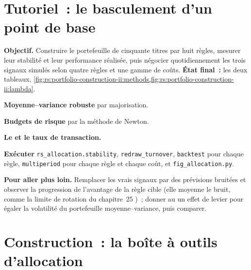 \section{Tutoriel~: le basculement d'un point de base}\label{tut:rs:portfolio-construction-ii:tut}

\begin{tutorial}
\textbf{Objectif.} Construire le portefeuille de cinquante titres par huit règles, mesurer leur stabilité et leur performance réalisée, puis négocier quotidiennement les trois signaux simulés selon
quatre règles et une gamme de coûts. \textbf{État final~:} les deux tableaux, \cref{fig:rs:portfolio-construction-ii:methods,fig:rs:portfolio-construction-ii:lambda}.
\begin{tutsteps}
\item \textbf{Moyenne--variance robuste} par majorisation.
\label{lst:rs:portfolio-construction-ii:robust}
\item \textbf{Budgets de risque} par la méthode de Newton.
\label{lst:rs:portfolio-construction-ii:budget}
\item \textbf{Le  et le taux de transaction.}
\label{lst:rs:portfolio-construction-ii:gp}
\item \textbf{Exécuter} \texttt{rs\_allocation.stability}, \texttt{redraw\_turnover}, \texttt{backtest} pour chaque règle, \texttt{multiperiod} pour chaque règle et chaque coût, et
\texttt{fig\_allocation.py}.
\end{tutsteps}
\textbf{Pour aller plus loin.} Remplacer les vrais signaux par des prévisions bruitées et observer la progression de l'avantage de la règle cible (elle moyenne le bruit, comme la limite de rotation du chapitre~25
)~; donner au  un effet de levier pour égaler la volatilité du portefeuille moyenne--variance, puis comparer.
\end{tutorial}

\section{Construction~: la boîte à outils d'allocation}\label{bld:rs:portfolio-construction-ii:allocation}

